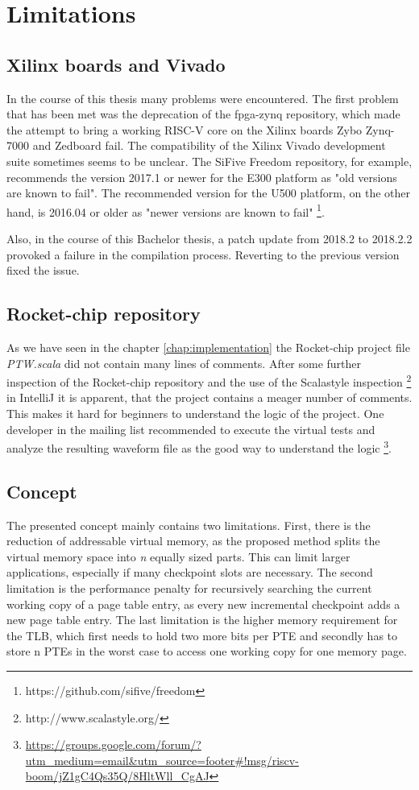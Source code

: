 \chapter{Limitations}
\label{chap:limitations}
\section{Xilinx boards and Vivado}
In the course of this thesis many problems were encountered.
The first problem that has been met was the deprecation of the
fpga-zynq repository, which made the attempt to bring
a working RISC-V core on the Xilinx boards Zybo Zynq-7000
and Zedboard fail.
The compatibility of the Xilinx Vivado development suite sometimes
seems to be unclear. The SiFive Freedom repository, for example,
recommends the version 2017.1 or newer for the E300 platform as
"old versions are known to fail". The recommended version for the
U500 platform, on the other hand, is 2016.04 or older as
"newer versions are known to fail"
\footnote{https://github.com/sifive/freedom}.

Also, in the course of this Bachelor thesis, a patch update from
2018.2 to 2018.2.2 provoked a failure in the compilation process.
Reverting to the previous version fixed the issue.

\section{Rocket-chip repository}
As we have seen in the chapter \ref{chap:implementation} the
Rocket-chip project file \textit{PTW.scala} did not contain many lines of
comments. After some further inspection of the Rocket-chip repository
and the use of the Scalastyle inspection \footnote{http://www.scalastyle.org/}
in IntelliJ it is apparent, that the project contains a meager
number of comments. This makes it hard for beginners to understand
the logic of the project. One developer in the mailing list recommended
to execute the virtual tests and analyze the resulting waveform file as the
good way to understand the logic
\footnote{\url{https://groups.google.com/forum/?utm_medium=email&utm_source=footer\#!msg/riscv-boom/jZ1gC4Qs35Q/8HltWll_CgAJ}}.

\section{Concept}
The presented concept mainly contains two limitations.
First, there is the reduction of addressable virtual memory, as the
proposed method splits the virtual memory space into \textit{n} equally sized
parts. This can limit larger applications, especially if many checkpoint
slots are necessary.
The second limitation is the performance penalty for recursively searching
the current working copy of a page table entry, as every new incremental
checkpoint adds a new page table entry.
The last limitation is the higher memory requirement for the TLB, which
first needs to hold two more bits per PTE and secondly has to store
n PTEs in the worst case to access one working copy for one memory page.